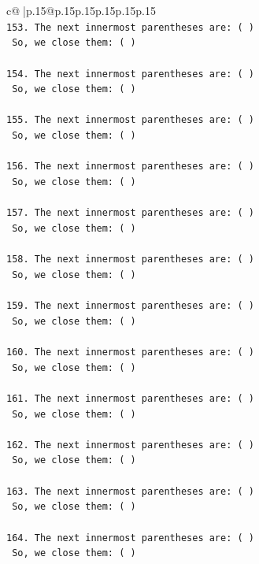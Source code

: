 \documentclass{article}
\begin{document}
{\begin{supertabular}{c@{$\;$}|p{.15\linewidth}@{}p{.15\linewidth}p{.15\linewidth}p{.15\linewidth}p{.15\linewidth}p{.15\linewidth}}
{{{\\ 
\texttt{153. The next innermost parentheses are: ( ) } \\
\texttt{    So, we close them: ( ) } \\
\\ 
\texttt{154. The next innermost parentheses are: ( ) } \\
\texttt{    So, we close them: ( ) } \\
\\ 
\texttt{155. The next innermost parentheses are: ( ) } \\
\texttt{    So, we close them: ( ) } \\
\\ 
\texttt{156. The next innermost parentheses are: ( ) } \\
\texttt{    So, we close them: ( ) } \\
\\ 
\texttt{157. The next innermost parentheses are: ( ) } \\
\texttt{    So, we close them: ( ) } \\
\\ 
\texttt{158. The next innermost parentheses are: ( ) } \\
\texttt{    So, we close them: ( ) } \\
\\ 
\texttt{159. The next innermost parentheses are: ( ) } \\
\texttt{    So, we close them: ( ) } \\
\\ 
\texttt{160. The next innermost parentheses are: ( ) } \\
\texttt{    So, we close them: ( ) } \\
\\ 
\texttt{161. The next innermost parentheses are: ( ) } \\
\texttt{    So, we close them: ( ) } \\
\\ 
\texttt{162. The next innermost parentheses are: ( ) } \\
\texttt{    So, we close them: ( ) } \\
\\ 
\texttt{163. The next innermost parentheses are: ( ) } \\
\texttt{    So, we close them: ( ) } \\
\\ 
\texttt{164. The next innermost parentheses are: ( ) } \\
\texttt{    So, we close them: ( ) } \\
}}}
\end{supertabular}}
\end{document}
